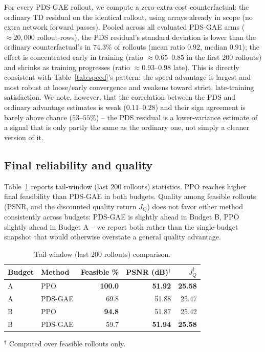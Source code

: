 \documentclass[conference]{IEEEtran}
\begin{document}
For every PDS-GAE rollout, we compute a zero-extra-cost counterfactual: the ordinary TD
residual on the identical rollout, using arrays already in scope (no extra network
forward passes). Pooled across all evaluated PDS-GAE arms ($\approx\!20{,}000$
rollout-rows), the PDS residual's standard deviation is lower than the ordinary
counterfactual's in $74.3\%$ of rollouts (mean ratio $0.92$, median $0.91$); the
effect is concentrated early in training (ratio $\approx\!0.65$--$0.85$ in the first
$200$ rollouts) and shrinks as training progresses (ratio $\approx\!0.93$--$0.98$ late).
This is directly consistent with Table~\ref{tab:speed}'s pattern: the speed advantage is
largest and most robust at loose/early convergence and weakens toward strict,
late-training satisfaction. We note, however, that the correlation between the PDS and
ordinary advantage estimates is weak ($0.11$--$0.28$) and their sign agreement is barely
above chance ($53$--$55\%$) -- the PDS residual is a lower-variance estimate of a
signal that is only partly the same as the ordinary one, not simply a cleaner version
of it.

\subsection{Final reliability and quality}

Table~\ref{tab:final} reports tail-window (last $200$ rollouts) statistics. PPO reaches
higher final feasibility than PDS-GAE in both budgets. Quality among feasible rollouts
(PSNR, and the discounted quality return $J_Q$) does not favor either method
consistently across budgets: PDS-GAE is slightly ahead in Budget B, PPO slightly ahead
in Budget A -- we report both rather than the single-budget snapshot that would
otherwise overstate a general quality advantage.

\begin{table}[t]
\centering
\caption{Tail-window (last 200 rollouts) comparison.}
\label{tab:final}
\begin{tabular}{@{}llrrr@{}}
\toprule
Budget & Method & Feasible \% & PSNR (dB)$^\dagger$ & $J_Q^\dagger$ \\
\midrule
A & PPO      & \textbf{100.0} & \textbf{51.92} & \textbf{25.58} \\
A & PDS-GAE  & 69.8  & 51.88 & 25.47 \\
B & PPO      & \textbf{94.8}  & 51.87 & 25.42 \\
B & PDS-GAE  & 59.7  & \textbf{51.94} & \textbf{25.58} \\
\bottomrule
\end{tabular}
\vspace{2pt}
\raggedright{\footnotesize $^\dagger$ Computed over feasible rollouts only.}
\end{table}
\end{document}
